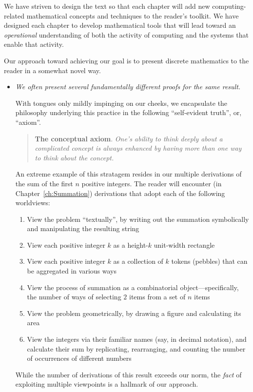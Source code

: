 We have striven to design the text so that each chapter will add new
computing-related mathematical concepts and techniques to the reader's
toolkit.  We have designed each chapter to develop mathematical tools
that will lead toward an {\em operational} understanding of both the
activity of computing and the systems that enable that activity.

Our approach toward achieving our goal is to present discrete
mathematics to the reader in a somewhat novel way.
\begin{itemize}
\item
{\em We often present several fundamentally different proofs for the
  same result.}

With tongues only mildly impinging on our cheeks, we encapsulate the
philosophy underlying this practice in the following ``self-evident
truth'', or, ``axiom''.  
\begin{quote}
{\bf The conceptual axiom}.
{\em
One's ability to think deeply about a complicated concept is always
enhanced by having more than one way to think about the concept.}
\end{quote}

An extreme example of this stratagem resides in our multiple
derivations of the sum of the first $n$ positive integers.  The reader
will encounter (in Chapter~\ref{ch:Summation}) derivations that adopt
each of the following worldviews:
  \begin{enumerate}
    \item
View the problem ``textually'', by writing out the summation
symbolically and manipulating the resulting string
  \item
View each positive integer $k$ as a height-$k$ unit-width rectangle
  \item
View each positive integer $k$ as a collection of $k$ tokens (pebbles)
that can be aggregated in various ways
  \item
View the process of summation as a combinatorial
object---specifically, the number of ways of selecting $2$ items from
a set of $n$ items
  \item
View the problem geometrically, by drawing a figure and calculating
its area
  \item
View the integers via their familiar names (say, in decimal notation),
and calculate their sum by replicating, rearranging, and counting the
number of occurrences of different numbers
  \end{enumerate}
While the number of derivations of this result exceeds our norm, the
{\em fact} of exploiting multiple viewpoints is a hallmark of our
approach.


\end{itemize}
